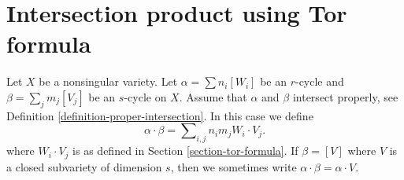 \section{Intersection product using Tor formula}
\label{section-intersection-product}

\noindent
Let $X$ be a nonsingular variety. Let
$\alpha = \sum n_i [W_i]$ be an $r$-cycle and
$\beta = \sum_j m_j [V_j]$ be an $s$-cycle on $X$.
Assume that $\alpha$ and $\beta$ intersect properly, see
Definition \ref{definition-proper-intersection}.
In this case we define
$$
\alpha \cdot \beta = \sum\nolimits_{i,j} n_i m_j W_i \cdot V_j.
$$
where $W_i \cdot V_j$ is as defined in Section \ref{section-tor-formula}.
If $\beta = [V]$ where $V$ is a closed subvariety of dimension $s$,
then we sometimes write $\alpha \cdot \beta = \alpha \cdot V$.


